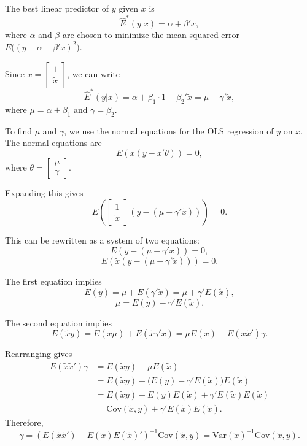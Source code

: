 \documentclass[12pt, letterpaper, onecolumn]{exam}
\begin{document}
\begin{solution}
    The best linear predictor of $y$ given $x$ is
    \[
        \hat{E}^{*}(y|x)=\alpha+\beta'x,
    \]
    where $\alpha$ and $\beta$ are chosen to minimize the mean squared error
    $E\big((y-\alpha-\beta'x)^{2}\big)$.

    Since $x=
        \begin{bmatrix}
            1 \\
            \tilde{x}
        \end{bmatrix}$, we can write
    \[
        \hat{E}^{*}(y|x)=\alpha+\beta_{1}\cdot 1 +\beta_{2}'\tilde{x}=\mu+\gamma
        ' \tilde{x},
    \]
    where $\mu=\alpha+\beta_{1}$ and $\gamma=\beta_{2}$.

    To find $\mu$ and $\gamma$, we use the normal equations for the OLS regression
    of $y$ on $x$. The normal equations are
    \[
        E(x(y-x'\theta))=0,
    \]
    where $\theta=
        \begin{bmatrix}
            \mu \\
            \gamma
        \end{bmatrix}$.

    Expanding this gives
    \[
        E\left(
        \begin{bmatrix}
            1 \\
            \tilde{x}
        \end{bmatrix}
        (y-(\mu+\gamma'\tilde{x}))\right)=0.
    \]

    This can be rewritten as a system of two equations:
    \[
        E(y-(\mu+\gamma'\tilde{x}))=0,
    \]
    \[
        E(\tilde{x}(y-(\mu+\gamma'\tilde{x})))=0.
    \]

    The first equation implies
    \[
        E(y)=\mu+E(\gamma'\tilde{x})=\mu+\gamma' E(\tilde{x}),
    \]
    \[
        \mu=E(y)-\gamma' E(\tilde{x}).
    \]

    The second equation implies
    \[
        E(\tilde{x}y)=E(\tilde{x}\mu)+E(\tilde{x}\gamma'\tilde{x})=\mu E(\tilde
        {x})+ E(\tilde{x}\tilde{x}')\gamma.
    \]

    Rearranging gives
    \begin{align*}
        E(\tilde{x}\tilde{x}')\gamma & =E(\tilde{x}y)-\mu E(\tilde{x})                                   \\
                                     & = E(\tilde{x}y)-\big(E(y)-\gamma' E(\tilde{x})\big)E(\tilde{x})   \\
                                     & =E(\tilde{x}y)-E (y)E(\tilde{x})+\gamma' E(\tilde{x})E(\tilde{x}) \\
                                     & =\mathrm{Cov}(\tilde{x},y)+\gamma' E(\tilde{x})E(\tilde{x}).
    \end{align*}
    Therefore,
    \[
        \gamma=(E(\tilde{x}\tilde{x}')-E(\tilde{x})E(\tilde{x})')^{-1}\mathrm{Cov}
        (\tilde{x},y)=\mathrm{Var}(\tilde{x})^{-1}\mathrm{Cov}(\tilde{x},y).
    \]
\end{solution}
\end{document}
